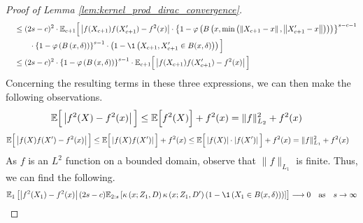 \begin{proof}[Proof of Lemma \ref{lem:kernel_prod_dirac_convergence}]
\begin{equation}
\begin{aligned}
            & \quad \leq (2s-c)^{2} \cdot
                \E_{c+1}\Big[\left|f(X_{c+1}) f(X_{c+1}^{\prime}) - f^{2}(x)\right|
                \cdot \left\{1-\varphi\left(B\left(x, \min\left(\left\|X_{c+1} - x\right\|, \left\|X_{c+1}^{\prime}-x\right\|\right)\right)\right)\right\}^{s-c-1} \\
                & \quad \quad \quad \cdot \left\{1-\varphi\left(B\left(x,\delta\right)\right)\right\}^{s-1}
                \cdot \left(1 - \1\left(X_{c+1}, X_{c+1}^{\prime} \in B(x, \delta)\right)\right)
            \Big]\\
            & \quad \leq (2s-c)^{2} \cdot \left\{1-\varphi\left(B\left(x,\delta\right)\right)\right\}^{s-1} \cdot
                \E_{c+1}\Big[\left|f(X_{c+1}) f(X_{c+1}^{\prime}) - f^{2}(x)\right|\Big]
        \end{aligned}
    \end{equation}
    Concerning the resulting terms in these three expressions, we can then make the following observations.
    \begin{equation}
        \begin{aligned}
            \mathbb{E}\Big[\left|f^{2}(X) - f^{2}(x)\right|\Big]
            & \leq \mathbb{E}\Big[f^{2}(X)\Big] + f^{2}(x)
            = \|f\|_{L_2}^{2} + f^{2}(x)
        \end{aligned}
    \end{equation}
    \begin{equation}
        \begin{aligned}
            \mathbb{E}\Big[\left|f(X) f(X^{\prime}) - f^{2}(x)\right|\Big]
            & \leq \mathbb{E}\Big[\left|f(X) f(X^{\prime})\right|\Big] + f^{2}(x)
            \leq \mathbb{E}\Big[\left|f(X)\right|\cdot \left|f(X^{\prime})\right|\Big] + f^{2}(x)
            = \|f\|_{L_1}^{2} + f^{2}(x)
        \end{aligned}
    \end{equation}
    As $f$ is an $L^2$ function on a bounded domain, observe that $\|f\|_{L_1}$ is finite.
    Thus, we can find the following.
    \begin{equation}
        \begin{aligned}
            \E_{1}\left[\left|f^{2}(X_{1}) - f^{2}(x) \right| (2s - c) 
                \E_{2:s}\left[\kappa\left(x; Z_{1}, D\right)\kappa\left(x; Z_{1}, D^{\prime}\right) 
                \left(1 - \1\left(X_1 \in B(x, \delta)\right)\right)
                \right]
            \right]
            \longrightarrow 0 \quad \text{as} \quad s \rightarrow \infty
        \end{aligned}

\end{equation}
\end{proof}
